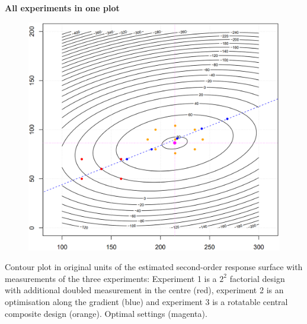 \textbf{All experiments in one plot}\\
\begin{figure}[H]
  \centering
  \includegraphics[width=.6\linewidth]{Pics/15.2.3.png}
\end{figure}
Contour plot in original units of the estimated second-order response surface with measurements of the three experiments: Experiment 1 is a $2^2$ factorial design with additional doubled measurement in the centre (red), experiment 2 is an optimisation along the gradient (blue) and experiment 3 is a rotatable central composite design (orange). Optimal settings (magenta).


\newpage
